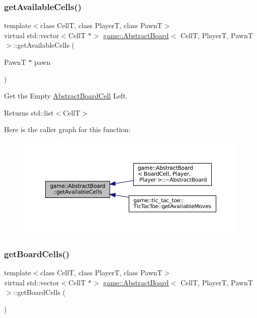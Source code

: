 \subsubsection{\texorpdfstring{get\+Available\+Cells()}{getAvailableCells()}}
{\footnotesize\ttfamily template$<$class CellT, class PlayerT, class PawnT$>$ \\
virtual std\+::vector$<$CellT $\ast$$>$ \hyperlink{classgame_1_1_abstract_board}{game\+::\+Abstract\+Board}$<$ CellT, PlayerT, PawnT $>$\+::get\+Available\+Cells (\begin{DoxyParamCaption}\item[{PawnT $\ast$}]{pawn }\end{DoxyParamCaption})\hspace{0.3cm}{\ttfamily [pure virtual]}}



Get the Empty \hyperlink{classgame_1_1_abstract_board_cell}{Abstract\+Board\+Cell} Left. 

\begin{DoxyReturn}{Returns}
std\+::list$<$\+Cell\+T$>$ 
\end{DoxyReturn}
Here is the caller graph for this function\+:
\nopagebreak
\begin{figure}[H]
\begin{center}
\leavevmode
\includegraphics[width=350pt]{classgame_1_1_abstract_board_a8def8902ce65947b506ecb129cb7b918_icgraph}
\end{center}
\end{figure}
\mbox{\label{classgame_1_1_abstract_board_a73d6bef66826688cd6e2bc0f37acb4b0}} 
\subsubsection{\texorpdfstring{get\+Board\+Cells()}{getBoardCells()}}
{\footnotesize\ttfamily template$<$class CellT, class PlayerT, class PawnT$>$ \\
virtual std\+::vector$<$CellT $\ast$$>$ \hyperlink{classgame_1_1_abstract_board}{game\+::\+Abstract\+Board}$<$ CellT, PlayerT, PawnT $>$\+::get\+Board\+Cells (\begin{DoxyParamCaption}{ }\end{DoxyParamCaption})\hspace{0.3cm}{\ttfamily [pure virtual]}}



